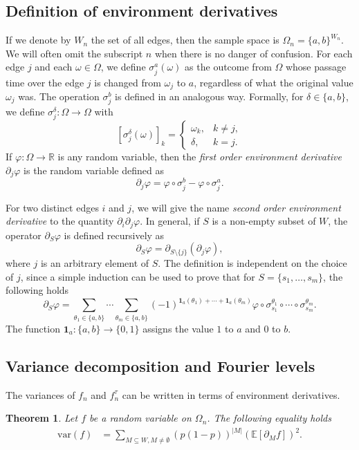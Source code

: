 \documentclass[reqno]{amsart}
\newtheorem{theorem}{Theorem}
\begin{document}
 
 
\subsection{Definition of environment derivatives}
If we denote by $W_n$ the set of all edges, then the sample space is $\Omega_n=\{a,b\}^{W_n}$. We will often omit the subscript $n$ when there is no danger of confusion. For each edge $j$ and each $\omega\in \Omega$, we define $\sigma_j^a(\omega)$ as the outcome from $\Omega$ whose passage time over the edge $j$ is changed from $\omega_j$ to $a$, regardless of what the original value $\omega_j$ was. The operation $\sigma_j^b$ is defined in an analogous way. Formally, for $\delta\in\{a,b\}$, we define $\sigma_j^{\delta}:\Omega\to\Omega$ with  
\[
\left[\sigma_j^{\delta}(\omega)\right]_k = \left\{\begin{array}{ll}\omega_k,& k\neq j,\\
\delta, &k=j.\end{array}\right.  
\]
If $\varphi:\Omega\to\mathbb R$ is any random variable, then the {\em first order environment derivative} $\partial_j\varphi$ is the random variable defined as 
\[
\partial_j\varphi=\varphi\circ \sigma_j^b-\varphi\circ \sigma_j^a.  
\]

For two distinct edges $i$ and $j$, we will give the name {\em second order environment derivative} to the quantity $\partial_{i}\partial_{j}\varphi$. In general, if $S$ is a non-empty subset of $W$, the operator $\partial_S\varphi$ is defined recursively as 
\[
\partial_S\varphi = \partial_{S\setminus\{j\}}\left(\partial_j\varphi\right), 
\]
where $j$ is an arbitrary element of $S$. The definition is independent on the choice of $j$, since a simple induction can be used to prove that for $S=\{s_1,\dots, s_m\}$, the following holds 
\[
\partial_S\varphi=\sum_{\theta_1\in\{a,b\}} \cdots\sum_{\theta_m\in\{a,b\}} (-1)^{\mathbf1_a(\theta_1)+ \cdots+\mathbf1_a(\theta_m)}\varphi\circ\sigma_{s_1}^{\theta_1} \circ\cdots\circ \sigma_{s_m}^{\theta_m}.  
\]
The function $\mathbf1_a:\{a,b\}\to \{0,1\}$ assigns the value $1$ to $a$ and $0$ to $b$. 



\subsection{Variance decomposition and Fourier levels} The variances of $f_n$ and $f_n^{\tau}$ can be
written in terms of environment derivatives. 
\begin{theorem}
\label{thm|varianceFormula}
Let $f$ be a random variable on $\Omega_n$. The following equality holds
\begin{align}
\text{var}(f)&=\sum_{M\subseteq W, M\neq\emptyset}\left(p(1-p)\right)^{|M|}\left(\mathbb E\left[\partial_Mf\right]\right)^2. \label{eqn|varianceFormula}
\end{align}
\end{theorem}
\end{document}
